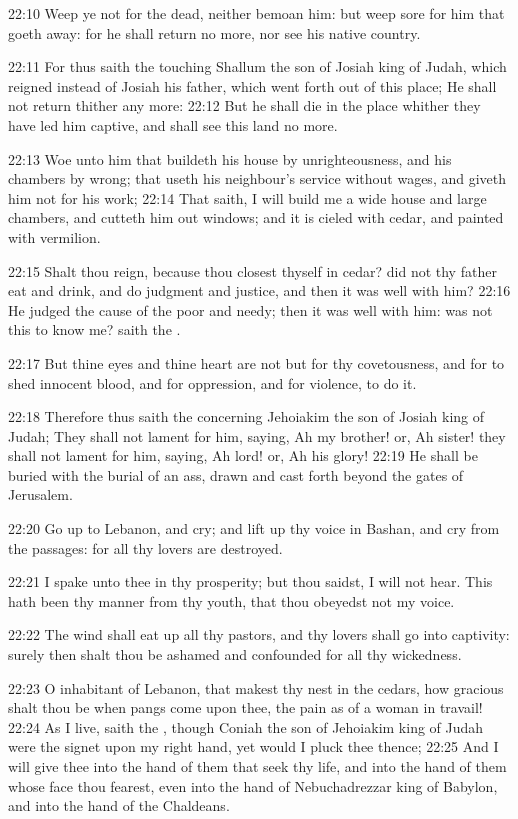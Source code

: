 22:10 Weep ye not for the dead, neither bemoan him: but weep sore for him that goeth away: for he shall return no more, nor see his native country.

22:11 For thus saith the \LORD touching Shallum the son of Josiah king of Judah, which reigned instead of Josiah his father, which went forth out of this place; He shall not return thither any more: 22:12 But he shall die in the place whither they have led him captive, and shall see this land no more.

22:13 Woe unto him that buildeth his house by unrighteousness, and his chambers by wrong; that useth his neighbour's service without wages, and giveth him not for his work; 22:14 That saith, I will build me a wide house and large chambers, and cutteth him out windows; and it is cieled with cedar, and painted with vermilion.

22:15 Shalt thou reign, because thou closest thyself in cedar? did not thy father eat and drink, and do judgment and justice, and then it was well with him?  22:16 He judged the cause of the poor and needy; then it was well with him: was not this to know me? saith the \LORD.

22:17 But thine eyes and thine heart are not but for thy covetousness, and for to shed innocent blood, and for oppression, and for violence, to do it.

22:18 Therefore thus saith the \LORD concerning Jehoiakim the son of Josiah king of Judah; They shall not lament for him, saying, Ah my brother! or, Ah sister! they shall not lament for him, saying, Ah lord! or, Ah his glory!  22:19 He shall be buried with the burial of an ass, drawn and cast forth beyond the gates of Jerusalem.

22:20 Go up to Lebanon, and cry; and lift up thy voice in Bashan, and cry from the passages: for all thy lovers are destroyed.

22:21 I spake unto thee in thy prosperity; but thou saidst, I will not hear. This hath been thy manner from thy youth, that thou obeyedst not my voice.

22:22 The wind shall eat up all thy pastors, and thy lovers shall go into captivity: surely then shalt thou be ashamed and confounded for all thy wickedness.

22:23 O inhabitant of Lebanon, that makest thy nest in the cedars, how gracious shalt thou be when pangs come upon thee, the pain as of a woman in travail!  22:24 As I live, saith the \LORD, though Coniah the son of Jehoiakim king of Judah were the signet upon my right hand, yet would I pluck thee thence; 22:25 And I will give thee into the hand of them that seek thy life, and into the hand of them whose face thou fearest, even into the hand of Nebuchadrezzar king of Babylon, and into the hand of the Chaldeans.

